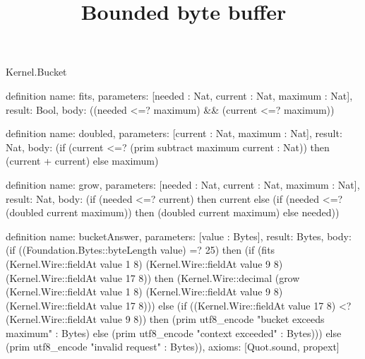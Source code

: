 \begin{lexlean}{Kernel.Bucket}
\title{Bounded byte buffer}
\begin{semanticmodule}
definition{
  name: fits,
  parameters: [needed : Nat, current : Nat, maximum : Nat],
  result: Bool,
  body: ((needed <=? maximum) && (current <=? maximum))
}

definition{
  name: doubled,
  parameters: [current : Nat, maximum : Nat],
  result: Nat,
  body: (if (current <=? (prim subtract maximum current : Nat)) then (current + current) else maximum)
}

definition{
  name: grow,
  parameters: [needed : Nat, current : Nat, maximum : Nat],
  result: Nat,
  body: (if (needed <=? current) then current else (if (needed <=? (doubled current maximum)) then (doubled current maximum) else needed))
}

definition{
  name: bucketAnswer,
  parameters: [value : Bytes],
  result: Bytes,
  body: (if ((Foundation.Bytes::byteLength value) =? 25) then (if (fits (Kernel.Wire::fieldAt value 1 8) (Kernel.Wire::fieldAt value 9 8) (Kernel.Wire::fieldAt value 17 8)) then (Kernel.Wire::decimal (grow (Kernel.Wire::fieldAt value 1 8) (Kernel.Wire::fieldAt value 9 8) (Kernel.Wire::fieldAt value 17 8))) else (if ((Kernel.Wire::fieldAt value 17 8) <? (Kernel.Wire::fieldAt value 9 8)) then (prim utf8_encode "bucket exceeds maximum" : Bytes) else (prim utf8_encode "context exceeded" : Bytes))) else (prim utf8_encode "invalid request" : Bytes)),
  axioms: [Quot.sound, propext]
}
\end{semanticmodule}
\end{lexlean}
